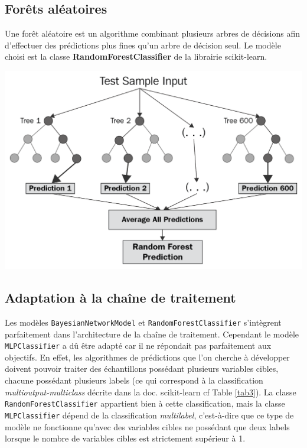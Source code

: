 \subsection{Forêts aléatoires}

Une forêt aléatoire est un algorithme combinant plusieurs arbres de décisions afin d’effectuer des prédictions plus fines qu’un arbre de décision seul. Le modèle choisi est la classe \textbf{RandomForestClassifier} de la librairie scikit-learn.

\begin{center}
\includegraphics[scale=0.25]{figures/exemple_RF.png}
\label{fig8}
\end{center}

\subsection{Adaptation à la chaîne de traitement}

Les modèles \texttt{BayesianNetworkModel} et \texttt{RandomForestClassifier} s’intègrent parfaitement dans l’architecture de la chaîne de traitement. Cependant le modèle \texttt{MLPClassifier} a dû être adapté car il ne répondait pas parfaitement aux objectifs. En effet, les algorithmes de prédictions que l’on cherche à développer doivent pouvoir traiter des échantillons possédant plusieurs variables cibles, chacune possédant plusieurs labels (ce qui correspond à la classification \textit{multioutput-multiclass} décrite dans la doc. scikit-learn cf Table \ref{tab3}). La classe \texttt{RandomForestClassifier} appartient bien à cette classification, mais la classe \texttt{MLPClassifier} dépend de la classification \textit{multilabel}, c’est-à-dire que ce type de modèle ne fonctionne qu’avec des variables cibles ne possédant que deux labels lorsque le nombre de variables cibles est strictement supérieur à 1.


